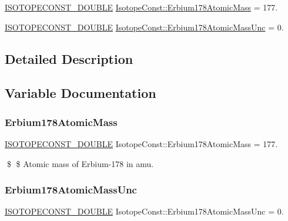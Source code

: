 \begin{DoxyCompactItemize}
\item 
\mbox{\hyperlink{group___isotope_const-_macros_ga8f45a7272ce02c0b4c65c44636ed719a}{I\+S\+O\+T\+O\+P\+E\+C\+O\+N\+S\+T\+\_\+\+D\+O\+U\+B\+LE}} \mbox{\hyperlink{group___isotope_const-_erbium-_er178_ga0faae5b5e48214125aa6efe44395297e}{Isotope\+Const\+::\+Erbium178\+Atomic\+Mass}} = 177.
\item 
\mbox{\hyperlink{group___isotope_const-_macros_ga8f45a7272ce02c0b4c65c44636ed719a}{I\+S\+O\+T\+O\+P\+E\+C\+O\+N\+S\+T\+\_\+\+D\+O\+U\+B\+LE}} \mbox{\hyperlink{group___isotope_const-_erbium-_er178_gab6d3970121d40e7d341a1db8ad33caaf}{Isotope\+Const\+::\+Erbium178\+Atomic\+Mass\+Unc}} = 0.
\end{DoxyCompactItemize}


\subsection{Detailed Description}


\subsection{Variable Documentation}
\mbox{\label{group___isotope_const-_erbium-_er178_ga0faae5b5e48214125aa6efe44395297e}} 
\subsubsection{\texorpdfstring{Erbium178\+Atomic\+Mass}{Erbium178AtomicMass}}
{\footnotesize\ttfamily \mbox{\hyperlink{group___isotope_const-_macros_ga8f45a7272ce02c0b4c65c44636ed719a}{I\+S\+O\+T\+O\+P\+E\+C\+O\+N\+S\+T\+\_\+\+D\+O\+U\+B\+LE}} Isotope\+Const\+::\+Erbium178\+Atomic\+Mass = 177.}

\$ \$ Atomic mass of Erbium-\/178 in amu. \mbox{\label{group___isotope_const-_erbium-_er178_gab6d3970121d40e7d341a1db8ad33caaf}} 
\subsubsection{\texorpdfstring{Erbium178\+Atomic\+Mass\+Unc}{Erbium178AtomicMassUnc}}
{\footnotesize\ttfamily \mbox{\hyperlink{group___isotope_const-_macros_ga8f45a7272ce02c0b4c65c44636ed719a}{I\+S\+O\+T\+O\+P\+E\+C\+O\+N\+S\+T\+\_\+\+D\+O\+U\+B\+LE}} Isotope\+Const\+::\+Erbium178\+Atomic\+Mass\+Unc = 0.}

